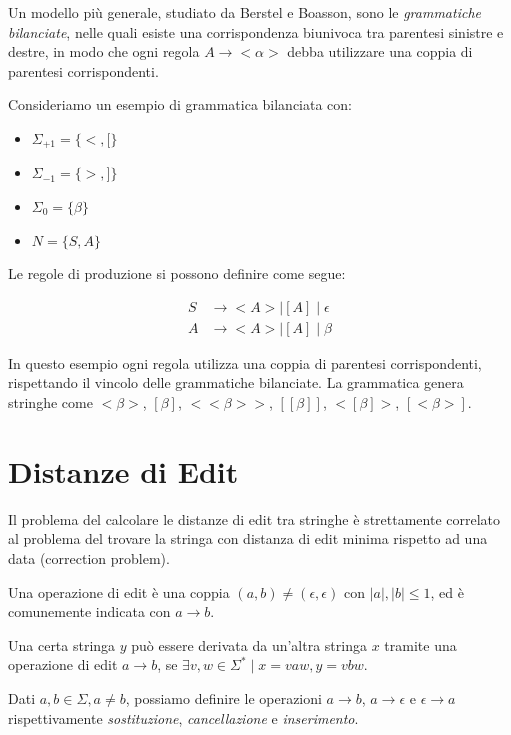 \documentclass[a4paper,12pt]{report}
\theoremstyle{propositionstyle}
\begin{document}
    Un modello più generale, studiato da Berstel e Boasson, sono le \textit{grammatiche bilanciate}, nelle quali esiste una corrispondenza biunivoca tra parentesi sinistre e destre, in modo che ogni regola $A \rightarrow <\alpha>$ debba utilizzare una coppia di parentesi corrispondenti.
    
    Consideriamo un esempio di grammatica bilanciata con:
    \begin{itemize}
        \item $\Sigma_{+1} = \{<, [\}$
        \item $\Sigma_{-1} = \{>, ]\}$
        \item $\Sigma_0 = \{\beta\}$
        \item $N = \{S, A\}$
    \end{itemize}
    
    Le regole di produzione si possono definire come segue:
    
    \begin{align}
        S &\rightarrow < A > \mid [A] \mid \epsilon \\
        A &\rightarrow < A > \mid [A] \mid \beta
    \end{align}
    
    In questo esempio ogni regola utilizza una coppia di parentesi corrispondenti, rispettando il vincolo delle grammatiche bilanciate. La grammatica genera stringhe come $<\beta>$, $[\beta]$, $<<\beta>>$, $[[\beta]]$, $<[\beta]>$, $[<\beta>]$.

    \section{Distanze di Edit}

    Il problema del calcolare le distanze di edit tra stringhe è strettamente correlato al problema del trovare la stringa con distanza di edit minima rispetto ad una data (correction problem).
    
    Una operazione di edit è una coppia $(a, b) \neq (\epsilon, \epsilon)$ con $\lvert a \rvert, \lvert b \rvert \leq 1$, ed è comunemente indicata con
    $a \rightarrow b$. 
    
    Una certa stringa $y$ può essere derivata da un'altra stringa $x$ tramite una operazione di edit $a \rightarrow b$, se $\exists v, w \in \Sigma^* \mid x = vaw, y = vbw$.
    
    Dati $a, b \in \Sigma, a \neq b$, possiamo definire le operazioni $a \rightarrow b$, $a \rightarrow \epsilon$ e $\epsilon \rightarrow a$ rispettivamente
    \textit{sostituzione}, \textit{cancellazione} e \textit{inserimento}.
    
\end{document}
